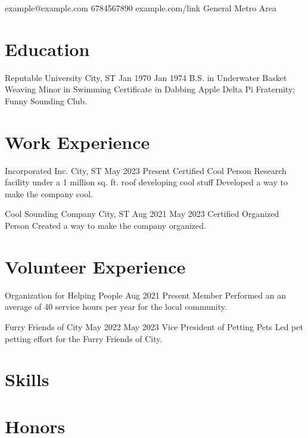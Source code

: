 \documentclass{resume}
\begin{document}
\contact
    {example@example.com} %
    {6784567890} %
    {example.com/link} %
    {General Metro Area} %

\section{Education}
\education
    {Reputable University} %
    {City, ST} %
    {Jan 1970} %
    {Jan 1974} %
    {B.S. in Underwater Basket Weaving} %
    {Minor in Swimming} %
    {Certificate in Dabbing} %
    {Apple Delta Pi Fraternity; Funny Sounding Club.} %

\section{Work Experience}
\work
    {Incorporated Inc.} %
    {City, ST} %
    {May 2023} %
    {Present} %
    {Certified Cool Person} %
    {Research facility under a 1 million sq. ft. roof developing cool stuff} %
    { %
        \newitem Developed a way to make the company cool.
    }

\work
    {Cool Sounding Company}
    {City, ST}
    {Aug 2021}
    {May 2023}
    {Certified Organized Person}
    {}
    {
        \newitem Created a way to make the company organized.
    }

\section{Volunteer Experience}
\volunteer
    {Organization for Helping People} %
    {Aug 2021} %
    {Present} %
    {Member} %
    { %
        \newitem Performed an an average of 40 service hours per year for the local community.
    }

\volunteer
    {Furry Friends of City}
    {May 2022}
    {May 2023}
    {Vice President of Petting Pets}
    {
        \newitem Led pet petting effort for the Furry Friends of City.
    }

\section{Skills}

\section{Honors}
\end{document}

